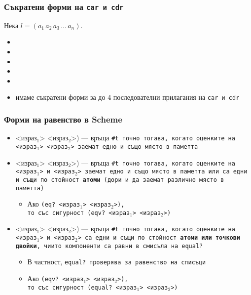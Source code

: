 \documentclass{beamer}
\begin{document}
\begin{frame}
  \frametitle{Съкратени форми на \tt{car} и \tt{cdr}}

  Нека $l = (a_1\,a_2\,a_3\,\ldots\,a_n)$.
  \begin{itemize}[<+->]
  \item {}
  \item {}
  \item {}
  \item {}
  \item {}
  \item имаме съкратени форми за до 4 последователни прилагания на \tt{car} и \tt{cdr}
  \end{itemize}
\end{frame}

\begin{frame}
  \frametitle{Форми на равенство в Scheme}

  \begin{itemize}[<+->]
  \item {}<израз$_1$> <израз$_2$>\tta) --- връща \tt{\#t} точно тогава, когато оценките на <израз$_1$> <израз$_2$> заемат едно и също място в паметта
  \item {}<израз$_1$> <израз$_2$>\tta) --- връща \tt{\#t} точно тогава, когато оценките на <израз$_1$> и <израз$_2$> заемат едно и също място в паметта или са едни и същи по стойност \textbf{атоми} (дори и да заемат различно място в паметта)
    \begin{itemize}
    \item Ако \tt{(eq? }<израз$_1$> <израз$_2$>\tt),\\
      то със сигурност \tt{(eqv? }<израз$_1$> <израз$_2$>\tt)
    \end{itemize}
  \item {}<израз$_1$> <израз$_2$>\tta) --- връща \tt{\#t} точно тогава, когато оценките на <израз$_1$> и <израз$_2$> са едни и същи по стойност \textbf{атоми или точкови двойки}, чиито компоненти са равни в смисъла на \tt{equal?}
    \begin{itemize}
    \item В частност, \tt{equal?} проверява за равенство на списъци
    \item Ако \tt{(eqv? }<израз$_1$> <израз$_2$>\tt),\\
      то със сигурност \tt{(equal? }<израз$_1$> <израз$_2$>\tt)
    \end{itemize}
  \end{itemize}
\end{frame}
\end{document}
